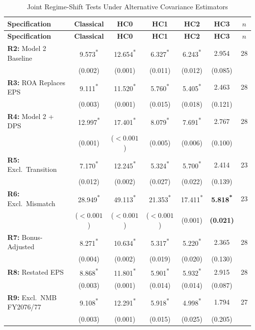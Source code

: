 {\small
\setlength{\tabcolsep}{5pt}
\begin{longtable}{@{\extracolsep{\fill}} l ccccc c @{}}
\caption{Joint Regime-Shift Tests Under Alternative Covariance Estimators}
\label{tab:cov_sensitivity}\\
\toprule
\textbf{Specification} & \textbf{Classical} & \textbf{HC0} & \textbf{HC1} & \textbf{HC2} & \textbf{HC3} & \textbf{$n$} \\
\midrule
\endfirsthead
\textbf{Specification} & \textbf{Classical} & \textbf{HC0} & \textbf{HC1} & \textbf{HC2} & \textbf{HC3} & \textbf{$n$} \\
\midrule
\endhead
\textbf{R2:} Model 2 Baseline & 9.573\textsuperscript{*} & 12.654\textsuperscript{*} & 6.327\textsuperscript{*} & 6.243\textsuperscript{*} & 2.954 & 28 \\
 & (0.002) & (0.001) & (0.011) & (0.012) & (0.085) & \\
\addlinespace
\textbf{R3:} ROA Replaces EPS & 9.111\textsuperscript{*} & 11.520\textsuperscript{*} & 5.760\textsuperscript{*} & 5.405\textsuperscript{*} & 2.463 & 28 \\
 & (0.003) & (0.001) & (0.015) & (0.018) & (0.121) & \\
\addlinespace
\textbf{R4:} Model 2 + DPS & 12.997\textsuperscript{*} & 17.401\textsuperscript{*} & 8.079\textsuperscript{*} & 7.691\textsuperscript{*} & 2.767 & 28 \\
 & (0.001) & ($<0.001$) & (0.005) & (0.006) & (0.100) & \\
\addlinespace
\textbf{R5:} Excl.\ Transition & 7.170\textsuperscript{*} & 12.245\textsuperscript{*} & 5.324\textsuperscript{*} & 5.700\textsuperscript{*} & 2.414 & 23 \\
 & (0.012) & (0.002) & (0.027) & (0.022) & (0.139) & \\
\addlinespace
\textbf{R6:} Excl.\ Mismatch & 28.949\textsuperscript{*} & 49.113\textsuperscript{*} & 21.353\textsuperscript{*} & 17.411\textsuperscript{*} & \textbf{5.818\textsuperscript{*}} & 23 \\
 & ($<0.001$) & ($<0.001$) & ($<0.001$) & (0.001) & \textbf{(0.021)} & \\
\addlinespace
\textbf{R7:} Bonus-Adjusted & 8.271\textsuperscript{*} & 10.634\textsuperscript{*} & 5.317\textsuperscript{*} & 5.220\textsuperscript{*} & 2.365 & 28 \\
 & (0.004) & (0.002) & (0.019) & (0.020) & (0.130) & \\
\addlinespace
\textbf{R8:} Restated EPS & 8.868\textsuperscript{*} & 11.801\textsuperscript{*} & 5.901\textsuperscript{*} & 5.932\textsuperscript{*} & 2.915 & 28 \\
 & (0.003) & (0.001) & (0.014) & (0.014) & (0.087) & \\
\addlinespace
\textbf{R9:} Excl.\ NMB FY2076/77 & 9.108\textsuperscript{*} & 12.291\textsuperscript{*} & 5.918\textsuperscript{*} & 4.998\textsuperscript{*} & 1.794 & 27 \\
 & (0.003) & (0.001) & (0.015) & (0.025) & (0.205) & \\
\bottomrule
\end{longtable}}

